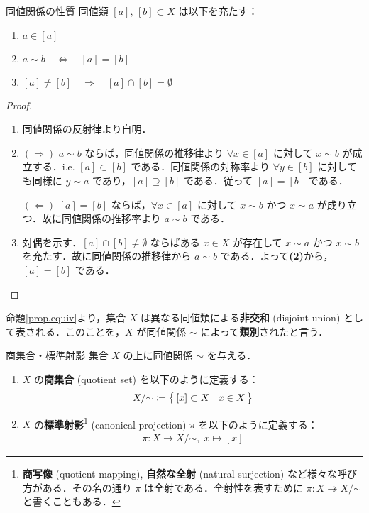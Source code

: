 \documentclass[geometry_main]{subfiles}
\begin{document}
\begin{myprop}[label=prop.equiv]{同値関係の性質}
	同値類 $[a],\, [b] \subset X$ は以下を充たす：
	\begin{enumerate}
		\item $a \in [a]$
		\item $a \sim b \quad \Longleftrightarrow \quad [a] = [b]$
		\item $[a] \neq [b] \quad \Longrightarrow \quad [a] \cap [b] = \emptyset$
	\end{enumerate}
\end{myprop}
\begin{proof}
	\begin{enumerate}
		\item 同値関係の反射律より自明．
		\item $(\Longrightarrow)$ $a \sim b$ ならば，同値関係の推移律より $\forall x \in [a]$ に対して $x \sim b$ が成立する．i.e. $[a] \subset [b]$ である．同値関係の対称率より $\forall y \in [b]$ に対しても同様に $y \sim a$ であり，$[a] \supseteq [b]$ である．従って $[a] = [b]$ である．
		
		$(\Longleftarrow)$ $[a] = [b]$ ならば，$\forall x \in [a]$ に対して $x\sim b$ かつ $x \sim a$ が成り立つ．故に同値関係の推移率より $a \sim b$ である．
		\item 対偶を示す．$[a] \cap [b] \neq \emptyset$ ならばある $x \in X$ が存在して $x \sim a$ かつ $x \sim b$ を充たす．故に同値関係の推移律から $a \sim b$ である．よって\textbf{(2)}から， $[a] = [b]$ である．
	\end{enumerate}
\end{proof}

命題\ref{prop.equiv}より，集合 $X$ は異なる同値類による\textbf{非交和} (disjoint union) として表される．このことを，$X$ が同値関係 $\sim$ によって\textbf{類別}されたと言う．

\begin{mydef}[label=def.quo-proj]{商集合・標準射影}
	集合 $X$ の上に同値関係 $\sim$ を与える．
	\begin{enumerate}
		\item $X$ の\textbf{商集合} (quotient set) を以下のように定義する：
		\begin{align}
			X/\mathord{\sim} \coloneqq \bigl\{\, [x] \subset X \bigm| x \in X \,\bigr\}
		\end{align}
		\item $X$ の\textbf{標準射影}\footnote{\textbf{商写像} (quotient mapping), \textbf{自然な全射} (natural surjection) など様々な呼び方がある．その名の通り $\pi$ は全射である．全射性を表すために $\pi \colon X \twoheadrightarrow X/\mathord{\sim}$ と書くこともある．} (canonical projection) $\pi$ を以下のように定義する：
		\begin{align}
			\pi \colon X \to X/\mathord{\sim} ,\; x \mapsto [x]
		\end{align}
	\end{enumerate}
\end{mydef}
\end{document}
